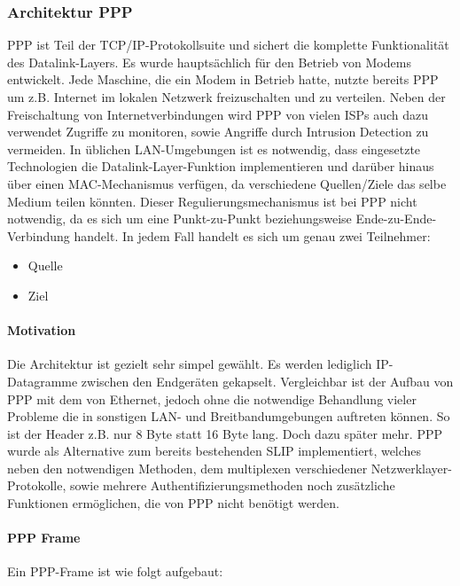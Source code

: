 \subsubsection{Architektur PPP}\label{subsubsection:architecture_ppp}
\ac{PPP} ist Teil der TCP/IP-Protokollsuite und sichert die komplette Funktionalität des
Datalink-Layers. Es wurde hauptsächlich für den Betrieb von Modems entwickelt. %
Jede Maschine, die ein Modem in Betrieb hatte, nutzte bereits \ac{PPP} um z.B.
Internet im lokalen Netzwerk freizuschalten und zu verteilen.
Neben der Freischaltung von Internetverbindungen wird \ac{PPP} von vielen \acp{ISP}
auch dazu verwendet Zugriffe zu monitoren, sowie Angriffe durch Intrusion Detection zu vermeiden.
In üblichen \ac{LAN}-Umgebungen ist es notwendig, dass eingesetzte Technologien die Datalink-Layer-Funktion
implementieren und darüber hinaus über einen MAC-Mechanismus verfügen, da verschiedene
Quellen/Ziele das selbe Medium teilen könnten. Dieser Regulierungsmechanismus ist bei \ac{PPP}
nicht notwendig, da es sich um eine Punkt-zu-Punkt beziehungsweise Ende-zu-Ende-Verbindung handelt.
In jedem Fall handelt es sich um genau zwei Teilnehmer:
\begin{itemize}
	\item Quelle
	\item Ziel
\end{itemize}


\paragraph{Motivation} Die Architektur ist gezielt sehr simpel gewählt. Es werden lediglich IP-Datagramme zwischen den
Endgeräten gekapselt. Vergleichbar ist der Aufbau von PPP mit dem von Ethernet, jedoch ohne
die notwendige Behandlung vieler Probleme die in sonstigen \ac{LAN}- und Breitbandumgebungen
auftreten können. So ist der Header z.B. nur 8 Byte statt 16 Byte lang. Doch dazu später mehr.
\ac{PPP} wurde als Alternative zum bereits bestehenden \ac{SLIP} implementiert, welches neben den notwendigen
Methoden, dem multiplexen verschiedener Netzwerklayer-Protokolle, sowie mehrere Authentifizierungsmethoden noch zusätzliche Funktionen ermöglichen, die von PPP nicht benötigt werden.

\paragraph{PPP Frame}
Ein \ac{PPP}-Frame ist wie folgt aufgebaut:

